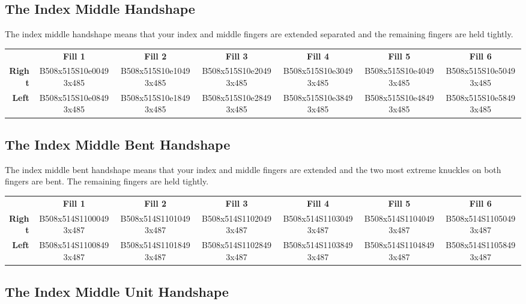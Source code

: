 \documentclass{article}
\begin{document}
\subsection{The Index Middle Handshape}

The index middle handshape means that your index and middle fingers are extended separated and the remaining fingers are held tightly.

\begin{center}
\begin{tabular}{r*{6}{c}}
&\textbf{Fill 1}&\textbf{Fill 2}&\textbf{Fill 3}&\textbf{Fill 4}&\textbf{Fill 5}&\textbf{Fill 6}\\
\textbf{Right}&
B508x515S10e00493x485&
B508x515S10e10493x485&
B508x515S10e20493x485&
B508x515S10e30493x485&
B508x515S10e40493x485&
B508x515S10e50493x485\\
\textbf{Left}&
B508x515S10e08493x485&
B508x515S10e18493x485&
B508x515S10e28493x485&
B508x515S10e38493x485&
B508x515S10e48493x485&
B508x515S10e58493x485\\
\end{tabular}
\end{center}

\subsection{The Index Middle Bent Handshape}

The index middle bent handshape means that your index and middle fingers are extended and the two most extreme knuckles on both fingers are bent.
The remaining fingers are held tightly.

\begin{center}
\begin{tabular}{r*{6}{c}}
&\textbf{Fill 1}&\textbf{Fill 2}&\textbf{Fill 3}&\textbf{Fill 4}&\textbf{Fill 5}&\textbf{Fill 6}\\
\textbf{Right}&
B508x514S11000493x487&
B508x514S11010493x487&
B508x514S11020493x487&
B508x514S11030493x487&
B508x514S11040493x487&
B508x514S11050493x487\\
\textbf{Left}&
B508x514S11008493x487&
B508x514S11018493x487&
B508x514S11028493x487&
B508x514S11038493x487&
B508x514S11048493x487&
B508x514S11058493x487\\
\end{tabular}
\end{center}

\subsection{The Index Middle Unit Handshape}
\end{document}
